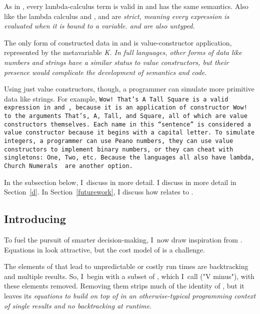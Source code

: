 \documentclass[manuscript,screen,review, 12pt, nonacm]{acmart}
\begin{document}
    As in \VC, every lambda-calculus term is valid in \VMinus and \D has the
    same semantics. Also like the lambda calculus and \VC, \VMinus and \D are
    \it{strict}, meaning every expression is evaluated when it is bound to a
    variable. \VMinus and \D are also untyped. 
    
    The only form of constructed data in \VMinus and \D is value-constructor
    application, represented by the metavariable \it{K}. In full languages,
    other forms of data like numbers and strings have a similar status to value
    constructors, but their presence would complicate the development of
    semantics and code. 
    
    Using just value constructors, though, a programmer can simulate more
    primitive data like strings. For example, \tt{Wow! That's A Tall Square} is
    a valid expression in \VMinus and \D, because it is an application of
    constructor \tt{Wow!} to the arguments \tt{That's}, \tt{A}, \tt{Tall}, and
    \tt{Square}, all of which are value constructors themselves. Each name in
    this “sentence” is considered a value constructor because it begins with a
    capital letter. To simulate integers, a programmer can use Peano numbers,
    they can use value constructors to implement binary numbers, or they can
    cheat with singletons: \tt{One}, \tt{Two}, etc. Because the languages all
    also have lambda, Church Numerals~\citep{church1985calculi} are another
    option. 

    In the subsection below, I~discuss \VMinus in more detail. I discuss \D in
    more detail in Section~\ref{d}. In Section~\ref{futurework}, I discuss how
    \VMinus relates to \VC. 

\subsection{Introducing \VMinus}
\label{vminus}

        To fuel the pursuit of smarter decision-making, I~now draw inspiration
        from \VC. Equations in \VC look attractive, but the cost model of \VC is
        a challenge. 
        
        The elements of \VC that lead to unpredictable or costly run times are
        backtracking and multiple results. So, I~begin with a subset of \VC,
        which I~call \VMinus ("V minus"), with these elements removed. Removing
        them strips much of the identity of \VC, but it leaves its
        \it{equations} to build on top of in an otherwise-typical programming
        context of single results and no backtracking at runtime. 
\end{document}
